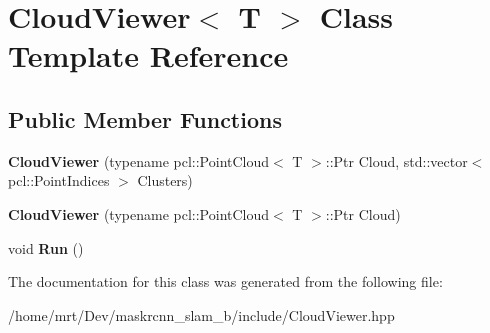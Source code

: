 \hypertarget{classCloudViewer}{}\section{Cloud\+Viewer$<$ T $>$ Class Template Reference}
\label{classCloudViewer}
\subsection*{Public Member Functions}
\begin{DoxyCompactItemize}
\item 
\mbox{\label{classCloudViewer_aa91e5e3696d55cbe76e28f112baf4725}} 
{\bfseries Cloud\+Viewer} (typename pcl\+::\+Point\+Cloud$<$ T $>$\+::Ptr Cloud, std\+::vector$<$ pcl\+::\+Point\+Indices $>$ Clusters)
\item 
\mbox{\label{classCloudViewer_a415fb5c3c3f39d3c6b73d9e9fb27290f}} 
{\bfseries Cloud\+Viewer} (typename pcl\+::\+Point\+Cloud$<$ T $>$\+::Ptr Cloud)
\item 
\mbox{\label{classCloudViewer_a5437cd2efaf18711dd646db18e01934e}} 
void {\bfseries Run} ()
\end{DoxyCompactItemize}


The documentation for this class was generated from the following file\+:\begin{DoxyCompactItemize}
\item 
/home/mrt/\+Dev/maskrcnn\+\_\+slam\+\_\+b/include/Cloud\+Viewer.\+hpp\end{DoxyCompactItemize}
